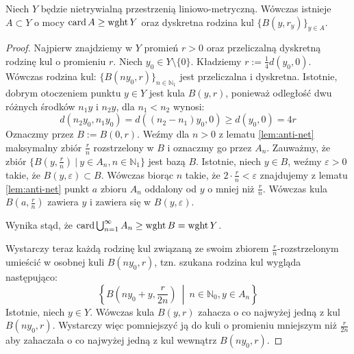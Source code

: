\begin{lem} \label{lem:balls-many}
  Niech $Y$ będzie nietrywialną przestrzenią liniowo-metryczną. Wówczas istnieje $A \subset Y$ o mocy $\operatorname{card} A \geq \operatorname{wght} Y$ oraz dyskretna rodzina kul $\{B(y, r_y)\}_{y \in A}$.
  
  \begin{proof}
    Najpierw znajdziemy w $Y$ promień $r > 0$ oraz przeliczalną dyskretną rodzinę kul o promieniu $r$. Niech $y_0 \in Y\setminus\{0\}$. Kładziemy $r := \frac{1}{4} d(y_0,0)$. Wówczas rodzina kul: $\{B(ny_0, r)\}_{n \in \mathbb{N}_1}$ jest przeliczalna i dyskretna. Istotnie, dobrym otoczeniem punktu $y \in Y$ jest kula $B(y,r)$, ponieważ odległość dwu różnych środków $n_1 y$ i $n_2 y$, dla $n_1 < n_2$ wynosi:
    \[
      d(n_2 y_0, n_1 y_0) = d((n_2 - n_1)y_0, 0) \geq d(y_0, 0) = 4r
    \]
    Oznaczmy przez $B := B(0,r)$. Weźmy dla $n > 0$ z lematu \ref{lem:anti-net} maksymalny zbiór $\frac{r}{n}$ rozstrzelony w $B$ i oznaczmy go przez $A_n$. Zauważmy, że zbiór $\{B(y, \frac{r}{n})\ |\ y \in A_n, n \in \mathbb{N}_1\}$ jest bazą $B$. Istotnie, niech $y \in B$, weźmy $\varepsilon > 0$ takie, że $B(y,\varepsilon) \subset B$. Wówczas biorąc $n$ takie, że $2 \cdot \frac{r}{n} < \varepsilon$ znajdujemy z lematu \ref{lem:anti-net} punkt $a$ zbioru $A_n$ oddalony od $y$ o mniej niż $\frac{r}{n}$. Wówczas kula $B(a, \frac{r}{n})$ zawiera $y$ i zawiera się w $B(y,\varepsilon)$.
    
    Wynika stąd, że $\operatorname{card} \bigcup_{n=1}^\infty A_n \geq \operatorname{wght} B = \operatorname{wght} Y$.
    
    Wystarczy teraz każdą rodzinę kul związaną ze swoim zbiorem $\frac{r}{n}$-rozstrzelonym umieścić w osobnej kuli $B(ny_0, r)$, tzn. szukana rodzina kul wygląda następująco:
    \[
      \left\{B\left(ny_0 + y, \frac{r}{2n}\right)\ \middle|\ n \in \mathbb{N}_0, y \in A_n\right\}
    \]
    Istotnie, niech $y \in Y$. Wówczas kula $B(y,r)$ zahacza o co najwyżej jedną z kul $B(ny_0, r)$. Wystarczy więc pomniejszyć ją do kuli o promieniu mniejszym niż $\frac{r}{2n}$ aby zahaczała o co najwyżej jedną z kul wewnątrz $B(ny_0, r)$.
  \end{proof}
\end{lem}


